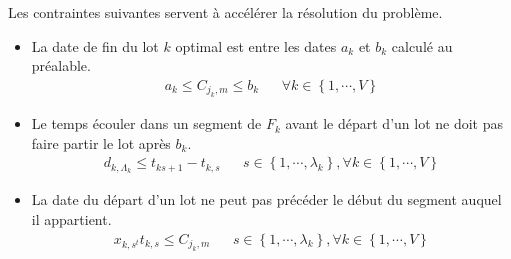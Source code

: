 Les contraintes suivantes servent à accélérer la résolution du problème.
\begin{itemize}
	\item
	      La date de fin du lot $k$ optimal est entre les dates $a_k$ et $b_k$ calculé au préalable.
	      \begin{align}
		      a_k \leq C_{j_k, m} \leq b_k &  & \forall k \in \left\{1,\cdots,V\right\}
	      \end{align}
	\item
	      Le temps écouler dans un segment de $F_k$ avant le départ d'un lot ne doit pas faire partir le lot après $b_k$.
	      \begin{align}
		      d_{k, \Lambda_k} \leq t_{k s+1} - t_{k, s} &  & s \in \left\{1,\cdots,\lambda_k\right\}, \forall k \in \left\{1,\cdots,V\right\}
	      \end{align}
	\item
	      La date du départ d'un lot ne peut pas précéder le début du segment auquel il appartient.
	      \begin{align}
		      x_{k, s^t} t_{k, s} \leq C_{j_k, m} &  & s \in \left\{1,\cdots,\lambda_k\right\}, \forall k \in \left\{1,\cdots,V\right\}
	      \end{align}
\end{itemize}
